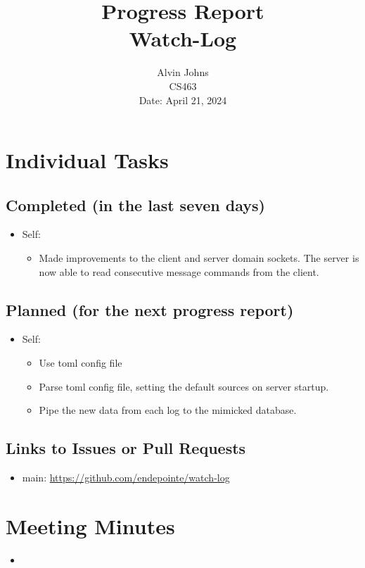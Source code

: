 \documentclass{article}
\title{Progress Report\\[0.5em]
\large Watch-Log}
\author{Alvin Johns\\
CS463\\
Date: April 21, 2024}
\date{}
\begin{document}
\maketitle

\section*{Individual Tasks}
\subsection*{Completed (in the last seven days)}
\begin{itemize}[label={--}]
    \item Self:
        \begin{itemize}[label={}]
            \item Made improvements to the client and server domain sockets. The server is now able to read consecutive message commands from the client.
        \end{itemize}
\end{itemize}

\subsection*{Planned (for the next progress report)}
\begin{itemize}[label={--}]
    \item Self:
        \begin{itemize}[label={}]
            \item Use toml config file
            \item Parse toml config file, setting the default sources on server startup.
            \item Pipe the new data from each log to the mimicked database. 
        \end{itemize}
\end{itemize}

\subsection*{Links to Issues or Pull Requests}
\begin{itemize}[label={--}]
    \item main: \url{https://github.com/endepointe/watch-log}
\end{itemize}

\section*{Meeting Minutes}
\begin{itemize}[label={--}]
    \item
\end{itemize}
\end{document}

